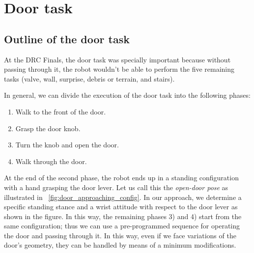 \section{Door task}
	\label{sub:door}

\subsection{Outline of the door task}
%
At the DRC Finals, the door task was specially important because without passing through it,
the robot wouldn't be able to perform the five remaining tasks
(valve, wall, surprise, debris or terrain, and stairs).
   
In general, we can divide the execution of the door task into the following phases:
%
\begin{enumerate}
	\item Walk to the front of the door.
	\item Grasp the door knob.
	\item Turn the knob and open the door.
	\item Walk through the door.
\end{enumerate}
%

%

At the end of the second phase, the robot ends up in a standing configuration with a hand grasping
the door lever.
Let us call this the {\it open-door pose} as illustrated in \figurename~\ref{fig:door_approaching_config}.
In our approach, we determine a specific standing stance and a wrist attitude with respect to 
the door lever as shown in the figure.
In this way, the remaining phases 3) and 4) start from the same configuration;
thus we can use a pre-programmed sequence for operating the door and passing through it.
In this way, even if we face variations of the door's geometry,
they can be handled by means of a minimum modifications.

